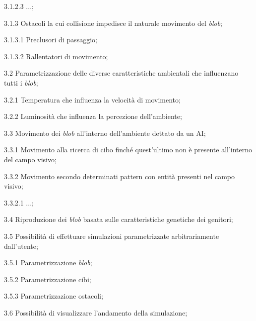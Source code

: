 \begin{myEnumerate}
\begin{myEnumerate}[label*=\arabic*.]
\begin{myEnumerate}[label*=\arabic*.]
\begin{myEnumerate}[label*=\arabic*.]
			\item[3.1.2.3] ...;
    		\end{myEnumerate}
		\item[3.1.3] Ostacoli la cui collisione impedisce il naturale movimento del \textit{blob};
		\begin{myEnumerate}[label*=\arabic*.]
        		\item[3.1.3.1] Preclusori di passaggio;
			\item[3.1.3.2] Rallentatori di movimento;
    		\end{myEnumerate}
    	\end{myEnumerate}
	\item[3.2] Parametrizzazione delle diverse caratteristiche ambientali che influenzano tutti i \textit{blob};
	\begin{myEnumerate}[label*=\arabic*.]
        	\item[3.2.1] Temperatura che influenza la velocità di movimento;
		\item[3.2.2] Luminosità che influenza la percezione dell'ambiente;
    	\end{myEnumerate}
	\item[3.3] Movimento dei \textit{blob} all'interno dell'ambiente dettato da un AI;
	\begin{myEnumerate}[label*=\arabic*.]
        	\item[3.3.1] Movimento alla ricerca di cibo finché quest'ultimo non è presente all'interno del campo visivo;
		\item[3.3.2] Movimento secondo determinati pattern con entità presenti nel campo visivo;
		\begin{myEnumerate}[label*=\arabic*.]
        		\item[3.3.2.1] ...;
    		\end{myEnumerate}
    	\end{myEnumerate}
	\item[3.4] Riproduzione dei \textit{blob} basata sulle caratteristiche genetiche dei genitori;
	\item[3.5] Possibilità di effettuare simulazioni parametrizzate arbitrariamente dall'utente;
	\begin{myEnumerate}[label*=\arabic*.]
		\item[3.5.1] Parametrizzazione \textit{blob};
		\item[3.5.2] Parametrizzazione cibi;
		\item[3.5.3] Parametrizzazione ostacoli;
	\end{myEnumerate}
	\item[3.6] Possibilità di visualizzare l'andamento della simulazione;	

\end{myEnumerate}
\end{myEnumerate}
